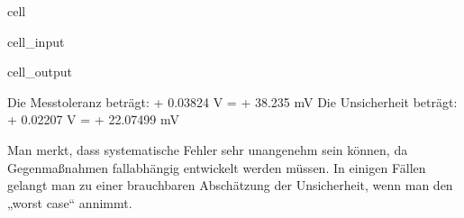 \documentclass[letterpaper,10pt,english]{jupyterBook}
\begin{document}
\begin{sphinxuseclass}{cell}\begin{sphinxVerbatimInput}

\begin{sphinxuseclass}{cell_input}
\begin{sphinxVerbatim}[commandchars=\\\{\}]
   
  
   
   
        
   
   
\end{sphinxVerbatim}

\end{sphinxuseclass}\end{sphinxVerbatimInput}
\begin{sphinxVerbatimOutput}

\begin{sphinxuseclass}{cell_output}
\begin{sphinxVerbatim}[commandchars=\\\{\}]
Die Messtoleranz beträgt: +\PYGZhy{} 0.03824 V = +\PYGZhy{} 38.235 mV
Die Unsicherheit beträgt: +\PYGZhy{} 0.02207 V = +\PYGZhy{} 22.07499 mV
\end{sphinxVerbatim}

\end{sphinxuseclass}\end{sphinxVerbatimOutput}

\end{sphinxuseclass}
\sphinxAtStartPar
Man merkt, dass systematische Fehler sehr unangenehm sein können, da Gegenmaßnahmen fallabhängig entwickelt werden müssen. In einigen Fällen gelangt man zu einer brauchbaren Abschätzung der Unsicherheit, wenn man den „worst case“ annimmt.
\end{document}
